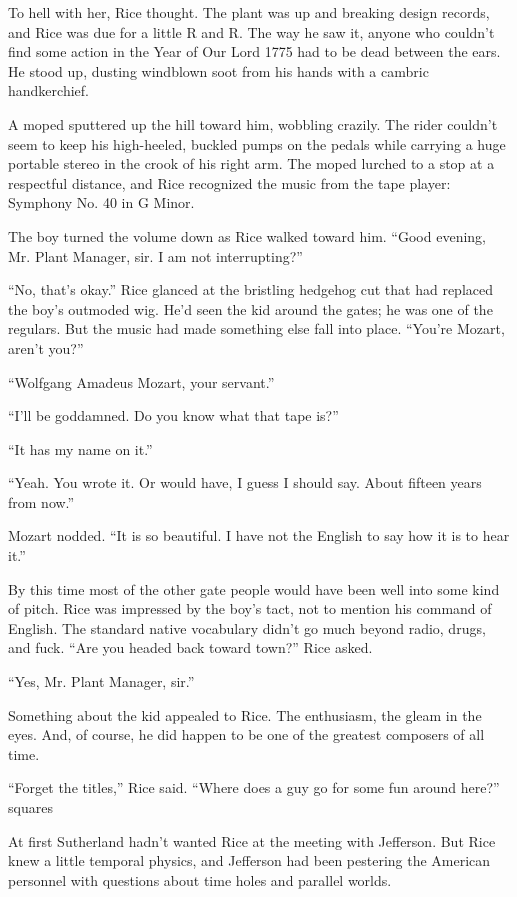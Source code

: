 To hell with her, Rice thought. The plant was up and breaking design records, and Rice was due for a little R and R. The way he saw it, anyone who couldn’t find some action in the Year of Our Lord 1775 had to be dead between the ears. He stood up, dusting windblown soot from his hands with a cambric handkerchief.

A moped sputtered up the hill toward him, wobbling crazily. The rider couldn’t seem to keep his high-heeled, buckled pumps on the pedals while carrying a huge portable stereo in the crook of his right arm. The moped lurched to a stop at a respectful distance, and Rice recognized the music from the tape player: Symphony No. 40 in G Minor.

The boy turned the volume down as Rice walked toward him. “Good evening, Mr. Plant Manager, sir. I am not interrupting?”

“No, that’s okay.” Rice glanced at the bristling hedgehog cut that had replaced the boy’s outmoded wig. He’d seen the kid around the gates; he was one of the regulars. But the music had made something else fall into place. “You’re Mozart, aren’t you?”

“Wolfgang Amadeus Mozart, your servant.”

“I’ll be goddamned. Do you know what that tape is?”

“It has my name on it.”

“Yeah. You wrote it. Or would have, I guess I should say. About fifteen years from now.”

Mozart nodded. “It is so beautiful. I have not the English to say how it is to hear it.”

By this time most of the other gate people would have been well into some kind of pitch. Rice was impressed by the boy’s tact, not to mention his command of English. The standard native vocabulary didn’t go much beyond radio, drugs, and fuck. “Are you headed back toward town?” Rice asked.

“Yes, Mr. Plant Manager, sir.”

Something about the kid appealed to Rice. The enthusiasm, the gleam in the eyes. And, of course, he did happen to be one of the greatest composers of all time.

“Forget the titles,” Rice said. “Where does a guy go for some fun around here?”
squares

At first Sutherland hadn’t wanted Rice at the meeting with Jefferson. But Rice knew a little temporal physics, and Jefferson had been pestering the American personnel with questions about time holes and parallel worlds.

